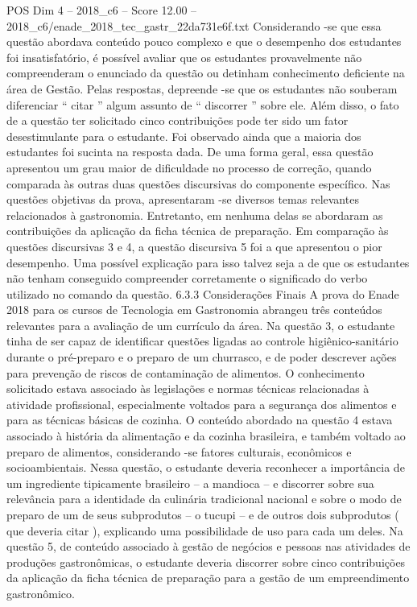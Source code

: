 \begin{textsample}{POS Dim 4 – 2018\_c6 – Score 12.00 – 2018\_c6/enade\_2018\_tec\_gastr\_22da731e6f.txt}
Considerando -se que essa questão abordava conteúdo pouco complexo e que o desempenho dos estudantes foi insatisfatório, é possível avaliar que os estudantes provavelmente não compreenderam o enunciado da questão ou detinham conhecimento deficiente na área de Gestão.
Pelas respostas, depreende -se que os estudantes não souberam diferenciar “ citar ” algum assunto de “ discorrer ” sobre ele.
Além disso, o fato de a questão ter solicitado cinco contribuições pode ter sido um fator desestimulante para o estudante.
Foi observado ainda que a maioria dos estudantes foi sucinta na resposta dada.
De uma forma geral, essa questão apresentou um grau maior de dificuldade no processo de correção, quando comparada às outras duas questões discursivas do componente específico.
Nas questões objetivas da prova, apresentaram -se diversos temas relevantes relacionados à gastronomia.
Entretanto, em nenhuma delas se abordaram as contribuições da aplicação da ficha técnica de preparação.
Em comparação às questões discursivas 3 e 4, a questão discursiva 5 foi a que apresentou o pior desempenho.
Uma possível explicação para isso talvez seja a de que os estudantes não tenham conseguido compreender corretamente o significado do verbo utilizado no comando da questão. 6.3.3 Considerações Finais A prova do Enade 2018 para os cursos de Tecnologia em Gastronomia abrangeu três conteúdos relevantes para a avaliação de um currículo da área.
Na questão 3, o estudante tinha de ser capaz de identificar questões ligadas ao controle higiênico-sanitário durante o pré-preparo e o preparo de um churrasco, e de poder descrever ações para prevenção de riscos de contaminação de alimentos.
O conhecimento solicitado estava associado às legislações e normas técnicas relacionadas à atividade profissional, especialmente voltados para a segurança dos alimentos e para as técnicas básicas de cozinha.
O conteúdo abordado na questão 4 estava associado à história da alimentação e da cozinha brasileira, e também voltado ao preparo de alimentos, considerando -se fatores culturais, econômicos e socioambientais.
Nessa questão, o estudante deveria reconhecer a importância de um ingrediente tipicamente brasileiro – a mandioca – e discorrer sobre sua relevância para a identidade da culinária tradicional nacional e sobre o modo de preparo de um de seus subprodutos – o tucupi – e de outros dois subprodutos ( que deveria citar ), explicando uma possibilidade de uso para cada um deles.
Na questão 5, de conteúdo associado à gestão de negócios e pessoas nas atividades de produções gastronômicas, o estudante deveria discorrer sobre cinco contribuições da aplicação da ficha técnica de preparação para a gestão de um empreendimento gastronômico.

\end{textsample}
